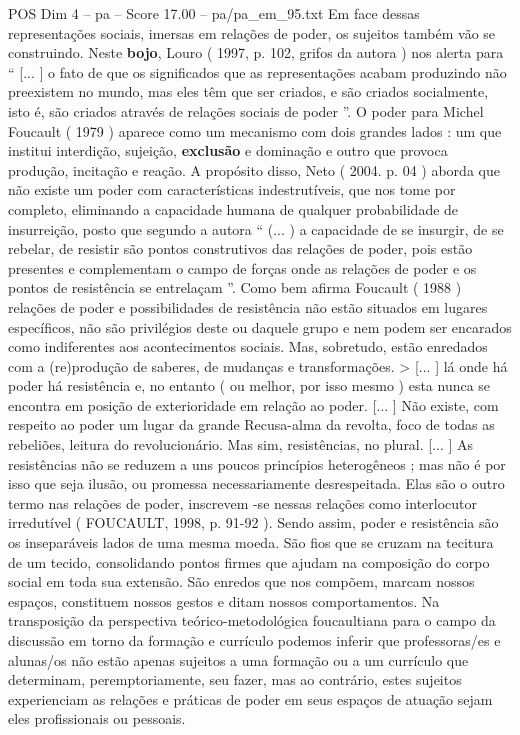 \begin{textsample}{POS Dim 4 – pa – Score 17.00 – pa/pa\_em\_95.txt}
Em face dessas representações sociais, imersas em relações de poder, os sujeitos também vão se construindo.
Neste \textbf{bojo}, Louro ( 1997, p. 102, grifos da autora ) nos alerta para “ [... ] o fato de que os significados que as representações acabam produzindo não preexistem no mundo, mas eles têm que ser criados, e são criados socialmente, isto é, são criados através de relações sociais de poder ”.
O poder para Michel Foucault ( 1979 ) aparece como um mecanismo com dois grandes lados : um que institui interdição, sujeição, \textbf{exclusão} e dominação e outro que provoca produção, incitação e reação.
A propósito disso, Neto ( 2004. p. 04 ) aborda que não existe um poder com características indestrutíveis, que nos tome por completo, eliminando a capacidade humana de qualquer probabilidade de insurreição, posto que segundo a autora “ (... ) a capacidade de se insurgir, de se rebelar, de resistir são pontos construtivos das relações de poder, pois estão presentes e complementam o campo de forças onde as relações de poder e os pontos de resistência se entrelaçam ”.
Como bem afirma Foucault ( 1988 ) relações de poder e possibilidades de resistência não estão situados em lugares específicos, não são privilégios deste ou daquele grupo e nem podem ser encarados como indiferentes aos acontecimentos sociais.
Mas, sobretudo, estão enredados com a (re)produção de saberes, de mudanças e transformações. > [... ] lá onde há poder há resistência e, no entanto ( ou melhor, por isso mesmo ) esta nunca se encontra em posição de exterioridade em relação ao poder. [... ] Não existe, com respeito ao poder um lugar da grande Recusa-alma da revolta, foco de todas as rebeliões, leitura do revolucionário.
Mas sim, resistências, no plural. [... ] As resistências não se reduzem a uns poucos princípios heterogêneos ; mas não é por isso que seja ilusão, ou promessa necessariamente desrespeitada.
Elas são o outro termo nas relações de poder, inscrevem -se nessas relações como interlocutor irredutível ( FOUCAULT, 1998, p. 91-92 ).
Sendo assim, poder e resistência são os inseparáveis lados de uma mesma moeda.
São fios que se cruzam na tecitura de um tecido, consolidando pontos firmes que ajudam na composição do corpo social em toda sua extensão.
São enredos que nos compõem, marcam nossos espaços, constituem nossos gestos e ditam nossos comportamentos.
Na transposição da perspectiva teórico-metodológica foucaultiana para o campo da discussão em torno da formação e currículo podemos inferir que professoras/es e alunas/os não estão apenas sujeitos a uma formação ou a um currículo que determinam, peremptoriamente, seu fazer, mas ao contrário, estes sujeitos experienciam as relações e práticas de poder em seus espaços de atuação sejam eles profissionais ou pessoais.

\end{textsample}
